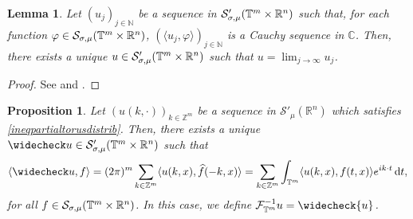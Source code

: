 \documentclass[11pt,reqno]{amsart}
\numberwithin{equation}{section}
\newtheorem{prop}[theorem]{Proposition}
\newtheorem{lemma}[theorem]{Lemma}
\theoremstyle{definition}
\theoremstyle{definition}
\newcommand{\T}{\mathbb{T}}
\newcommand{\G}{\mathnormal{\mathbb{T}^{m}\times\mathbb{R}^n}}
\newcommand{\R}{\mathbb{R}}
\newcommand{\Z}{\mathbb{Z}}
\newcommand{\N}{\mathbb{N}}
\renewcommand{\S}{\mathcal{S}_{\sigma,\mu}(\G)}
\renewcommand{\SS}{\mathcal{S}'_{\sigma,\mu}(\G)}
\begin{document}
    \begin{lemma}\label{lemma_unifbound}
        Let $(u_j)_{j\in\N}$ be a sequence in $\SS$ such that, for each function $\varphi\in\S$, $(\langle u_j,\varphi\rangle)_{j\in\N}$ is a Cauchy sequence in $\mathbb{C}$. Then, there exists a unique $u\in\SS$ such that $u=\displaystyle\lim_{j\to\infty}u_j$.
    \end{lemma}
    \begin{proof}
        See \cite[Lemma 2.1]{KowTmRn} and \cite[Theorem 2.9]{AvCap2022}.
    \end{proof}

    \begin{prop}\label{inverse-sequence-distrib}
        Let $(u(k,\cdot))_{k\in\Z^m}$ be a sequence in $\mathcal{S}'_\mu(\R^n)$ which satisfies \eqref{ineqpartialtorusdistrib}. Then, there exists a unique $\widecheck u\in\SS$ such that
        \[\langle \widecheck u,f\rangle = (2\pi)^m\sum_{k\in\Z^m}\langle u(k,x),\widehat{f}(-k,x)\rangle=\sum_{k\in\Z^m}\int_{\T^m}\langle u(k,x),f(t,x)\rangle e^{ik\cdot t}\,\mathrm{d}t,\]
        for all $f\in\S$. In this case, we define $\mathcal{F}_{\T^m}^{-1}u=\widecheck{u}$.
    \end{prop}
\end{document}
